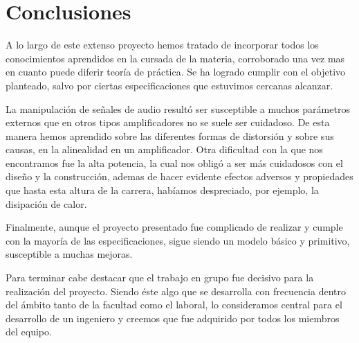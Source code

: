 \section{Conclusiones}

A lo largo de este extenso proyecto hemos tratado de incorporar todos los conocimientos aprendidos en la cursada de la materia, corroborado una vez mas en cuanto puede diferir teoría de práctica. Se ha logrado cumplir con el objetivo planteado, salvo por ciertas especificaciones que estuvimos cercanas alcanzar.

La manipulación de señales de audio resultó ser susceptible a muchos parámetros externos que en otros tipos amplificadores no se suele ser cuidadoso. De esta manera hemos aprendido sobre las diferentes formas de distorsión y sobre sus causas, en la alinealidad en un amplificador.
Otra dificultad con la que nos encontramos fue la alta potencia, la cual nos obligó a ser más cuidadosos con el diseño y la construcción, ademas de hacer evidente efectos adversos y propiedades que hasta esta altura de la carrera, habíamos despreciado, por ejemplo, la disipación de calor.

Finalmente, aunque el proyecto presentado fue complicado de realizar y cumple con la mayoría de las especificaciones, sigue siendo un modelo básico y primitivo, susceptible a muchas mejoras.

Para terminar cabe destacar que el trabajo en grupo fue decisivo para la realización del proyecto. Siendo éste algo que se desarrolla con frecuencia dentro del ámbito tanto de la facultad como el laboral, lo consideramos central para el desarrollo de un ingeniero y creemos que fue adquirido por todos los miembros del equipo.


\bigskip